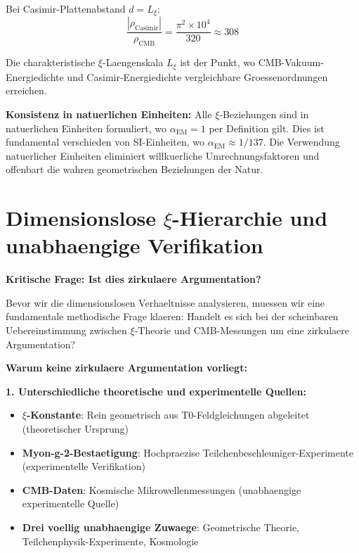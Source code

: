 \documentclass[12pt,a4paper]{article}
\begin{document}
	Bei Casimir-Plattenabstand $d = L_\xi$:
	\begin{equation}
		\frac{|\rho_{\text{Casimir}}|}{\rho_{\text{CMB}}} = \frac{\pi^2 \times 10^4}{320} \approx 308
	\end{equation}
	
	\begin{important}
		Die charakteristische $\xi$-Laengenskala $L_\xi$ ist der Punkt, wo CMB-Vakuum-Energiedichte und Casimir-Energiedichte vergleichbare Groessenordnungen erreichen.
	\end{important}
	
	\textbf{Konsistenz in natuerlichen Einheiten:}
	Alle $\xi$-Beziehungen sind in natuerlichen Einheiten formuliert, wo $\alpha_{\text{EM}} = 1$ per Definition gilt. Dies ist fundamental verschieden von SI-Einheiten, wo $\alpha_{\text{EM}} \approx 1/137$. Die Verwendung natuerlicher Einheiten eliminiert willkuerliche Umrechnungsfaktoren und offenbart die wahren geometrischen Beziehungen der Natur.
	
	\section{Dimensionslose $\xi$-Hierarchie und unabhaengige Verifikation}
	
	\textbf{Kritische Frage: Ist dies zirkulaere Argumentation?}
	
	Bevor wir die dimensionslosen Verhaeltnisse analysieren, muessen wir eine fundamentale methodische Frage klaeren: Handelt es sich bei der scheinbaren Uebereinstimmung zwischen $\xi$-Theorie und CMB-Messungen um eine zirkulaere Argumentation?
	
	\textbf{Warum keine zirkulaere Argumentation vorliegt:}
	
	\textbf{1. Unterschiedliche theoretische und experimentelle Quellen:}
	\begin{itemize}
		\item \textbf{$\xi$-Konstante}: Rein geometrisch aus T0-Feldgleichungen abgeleitet (theoretischer Ursprung)
		\item \textbf{Myon-g-2-Bestaetigung}: Hochpraezise Teilchenbeschleuniger-Experimente (experimentelle Verifikation)
		\item \textbf{CMB-Daten}: Kosmische Mikrowellenmessungen (unabhaengige experimentelle Quelle)
		\item \textbf{Drei voellig unabhaengige Zuwaege}: Geometrische Theorie, Teilchenphysik-Experimente, Kosmologie
	\end{itemize}
	
\end{document}
